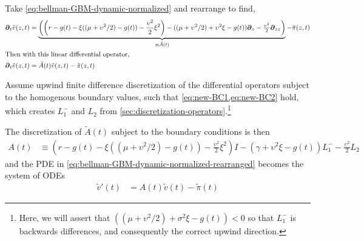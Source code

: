 \documentclass[11pt]{article}
\newcommand{\D}[1][]{\ensuremath{\boldsymbol{\partial}_{#1}}}
\newcommand{\R}{\ensuremath{\mathbb{R}}}
\begin{document}
Take \cref{eq:bellman-GBM-dynamic-normalized} and rearrange to find,
\begin{align}
	\D[t]\tilde{v}(z,t) &= \underbrace{\left(\left(r - g(t)- \xi((\mu + \upsilon^2/2)-g(t)) - \frac{\upsilon^2}{2}\xi^2\right) - ((\mu + \upsilon^2/2) + \upsilon^2\xi - g(t)) \D[z] - \tfrac{\upsilon^2}{2} \D[zz]\right)}_{\equiv \tilde{A}(t)} - \tilde{\pi}(z,t) \label{eq:bellman-GBM-dynamic-normalized-rearranged}\\
	\intertext{Then with this linear differential operator,}
	\D[t]\tilde{v}(z,t) &= \tilde{A}(t) \tilde{v}(z,t) - \tilde{\pi}(z,t)
\end{align}

Assume upwind finite difference discretization of the differential operators subject to the homogenous boundary values, such that \cref{eq:new-BC1,eq:new-BC2} hold, which creates $L^{-}_1$ and $L_2$ from \cref{sec:discretization-operators}.\footnote{Here, we will assert that $((\mu + \upsilon^2/2) + \sigma^2\xi - g(t)) < 0$ so that $L^{-}_1$ is backwards differences, and consequently the correct upwind direction.}

The discretization of $\tilde{A}(t)$ subject to the boundary conditions is then
\begin{align}
A(t) &\equiv \left(r - g(t)- \xi((\mu + \upsilon^2/2)-g(t)) - \frac{\upsilon^2}{2}\xi^2\right) I - (\gamma + \upsilon^2\xi - g(t)) L^{-}_1 - \tfrac{\upsilon^2}{2} L_2\label{eq:A-def-simple}
\end{align}
and the PDE in \cref{eq:bellman-GBM-dynamic-normalized-rearranged} becomes the system of ODEs
\begin{align}
	\tilde{v}'(t) &= A(t) \tilde{v}(t) - \tilde{\pi}(t)
\end{align}	


\end{document}
